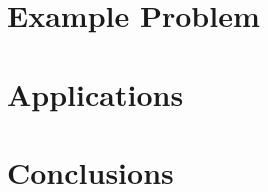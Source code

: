 \documentclass[]{aiaa-tc} %
\begin{document}
    
\section{Example Problem}

\section{Applications}

\section{Conclusions}
\end{document}
